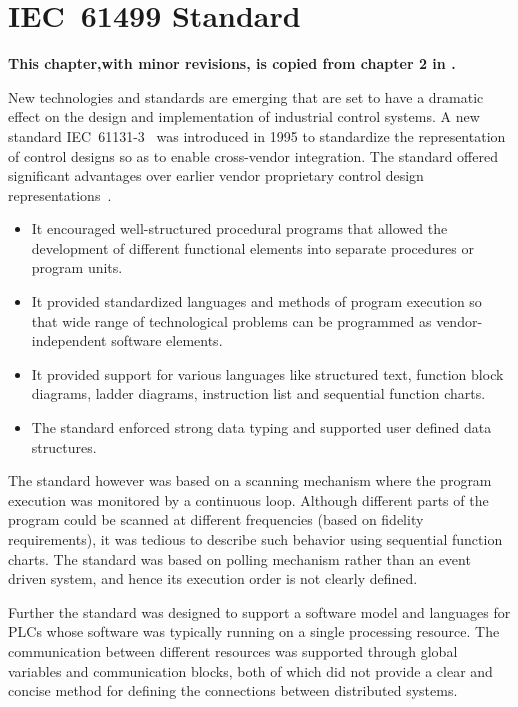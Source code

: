 
\chapter{IEC~61499 Standard}
\label{functionblocks}

\textbf{This chapter,with minor revisions, is copied from
  chapter 2 in \cite{j:des:2002}.}

New technologies and standards are emerging that are set to
have a dramatic effect on the design and implementation of
industrial control systems. A new standard
IEC~61131-3~\cite{iec:1131:1993} was introduced in 1995 to
standardize the representation of control designs so as to
enable cross-vendor integration. The standard offered
significant advantages over earlier vendor proprietary
control design representations~\cite{l:pro:1995}.
\begin{itemize}
\item It encouraged well-structured procedural programs that
  allowed the development of different functional elements
  into separate procedures or program units.
\item It provided standardized languages and methods of
  program execution so that wide range of technological
  problems can be programmed as vendor-independent software
  elements.
\item It provided support for various languages like
  structured text, function block diagrams, ladder diagrams,
  instruction list and sequential function charts.
\item The standard enforced strong data typing and supported
  user defined data structures.
\end{itemize}

The standard however was based on a scanning mechanism where
the program execution was monitored by a continuous loop.
Although different parts of the program could be scanned at
different frequencies (based on fidelity requirements), it
was tedious to describe such behavior using sequential
function charts. The standard was based on polling mechanism
rather than an event driven system, and hence its execution
order is not clearly defined.

Further the standard was designed to support a software
model and languages for PLCs whose software was typically
running on a single processing resource. The communication
between different resources was supported through global
variables and communication blocks, both of which did not
provide a clear and concise method for defining the
connections between distributed systems.

